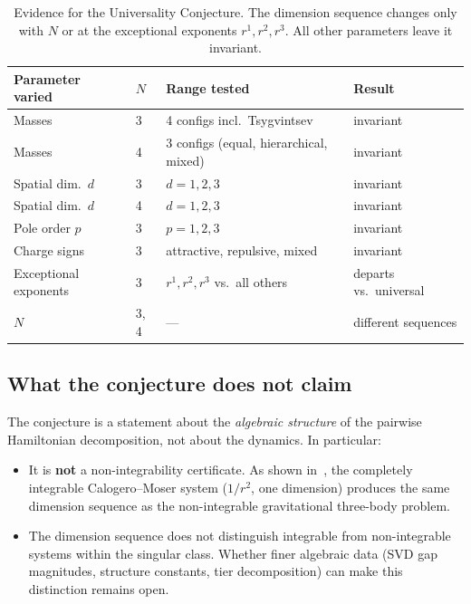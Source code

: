 \documentclass[11pt,a4paper]{article}
\theoremstyle{remark}
\begin{document}
\begin{table}[ht]
\centering
\small
\begin{tabular}{@{}llll@{}}
\toprule
Parameter varied & $N$ & Range tested & Result \\
\midrule
Masses & 3 & 4 configs incl.\ Tsygvintsev
  & invariant~\cite{paper1} \\
Masses & 4 & 3 configs
  (equal, hierarchical, mixed)
  & invariant \\
Spatial dim.\ $d$ & 3 & $d = 1, 2, 3$
  & invariant \\
Spatial dim.\ $d$ & 4 & $d = 1, 2, 3$
  & invariant \\
Pole order $p$ & 3 & $p = 1, 2, 3$
  & invariant \\
Charge signs & 3 & attractive, repulsive, mixed
  & invariant \\
\midrule
Exceptional exponents & 3 & $r^1, r^2, r^3$ vs.\ all others
  & departs vs.\ universal \\
$N$ & 3, 4 & --- & different sequences \\
\bottomrule
\end{tabular}
\caption{Evidence for the Universality Conjecture.  The
  dimension sequence changes only with $N$ or at the
  exceptional exponents $r^1, r^2, r^3$.  All
  other parameters leave it invariant.}
\label{tab:evidence}
\end{table}

\subsection{What the conjecture does not claim}

The conjecture is a statement about the \emph{algebraic
structure} of the pairwise Hamiltonian decomposition, not
about the dynamics.  In particular:

\begin{itemize}[nosep]
  \item It is \textbf{not} a non-integrability
    certificate.  As shown in~\cite{paper1}, the
    completely integrable Calogero--Moser system ($1/r^2$,
    one dimension) produces the same dimension sequence as
    the non-integrable gravitational three-body problem.
  \item The dimension sequence does not distinguish
    integrable from non-integrable systems within the
    singular class.  Whether finer algebraic data (SVD gap
    magnitudes, structure constants, tier decomposition)
    can make this distinction remains open.
\end{itemize}
\end{document}
